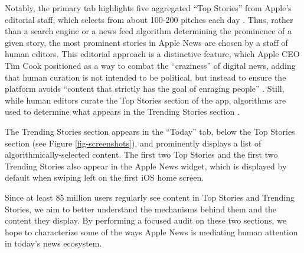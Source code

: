 Notably, the primary tab highlights five aggregated ``Top Stories'' from Apple's editorial staff, which selects from about 100-200 pitches each day \citep{Nicas2018}. Thus, rather than a search engine or a news feed algorithm determining the prominence of a given story, the most prominent stories in Apple News are chosen by a staff of human editors. This editorial approach is a distinctive feature, which Apple CEO Tim Cook positioned as a way to combat the ``craziness'' of digital news, adding that human curation is not intended to be political, but instead to ensure the platform avoids ``content that strictly has the goal of enraging people'' \citep{Burch2018}. Still, while human editors curate the Top Stories section of the app, algorithms are used to determine what appears in the Trending Stories section \citep{Nicas2018}.

The Trending Stories section appears in the ``Today'' tab, below the Top Stories section (see Figure \ref{fig-screenshots}), and prominently displays a list of algorithmically-selected content. The first two Top Stories and the first two Trending Stories also appear in the Apple News widget, which is displayed by default when swiping left on the first iOS home screen.

Since at least 85 million users regularly see content in Top Stories and Trending Stories, we aim to better understand the mechanisms behind them and the content they display. By performing a focused audit on these two sections, we hope to characterize some of the ways Apple News is mediating human attention in today's news ecosystem.

